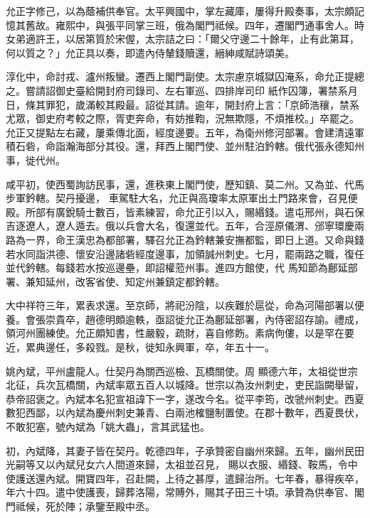 \begin{pinyinscope}
 允正字修己，以為蔭補供奉官。太平興國中，掌左藏庫，屢得升殿奏事，太宗頗記憶其舊故。雍熙中，與張平同掌三班，俄為閣門祗候。四年，遷閣門通事舍人。時女弟適許王，以居第質於宋偓，太宗詰之曰：「爾父守邊二十餘年，止有此第耳，何以質之？」允正具以奏，即遣內侍輦錢贖還，縉紳咸賦詩頌美。



 淳化中，命討戎、瀘州叛蠻。遷西上閣門副使。太宗慮京城獄囚淹系，命允正提總之。嘗請詔御史臺給開封府司錄司、左右軍巡、四排岸司印
 紙作囚簿，署禁系月日，條其罪犯，歲滿較其殿最。詔從其請。逾年，開封府上言：「京師浩穰，禁系尤眾，御史府考較之際，胥吏奔命，有妨推鞫，況無欺隱，不煩推校。」卒罷之。允正又提點左右藏，屢乘傳北面，經度邊要。五年，為衛州修河部署。會建清遠軍積石砦，命詣瀚海部分其役。還，拜西上閣門使、並州駐泊鈐轄。俄代張永德知州事，徙代州。



 咸平初，使西蜀詢訪民事，還，進秩東上閣門使，歷知鎮、莫二州。又為並、代馬步軍鈐轄。契丹擾邊，
 車駕駐大名，允正與高瓊率太原軍出土門路來會，召見便殿。所部有廣銳騎士數百，皆素練習，命允正引以入，賜緡錢。遣屯邢州，與石保吉逐遼人，遼人遁去。俄以兵會大名，復還並代。五年，合涇原儀渭、邠寧環慶兩路為一界，命王漢忠為都部署，驛召允正為鈐轄兼安撫都監，即日上道。又命與錢若水同詣洪德、懷安沿邊諸砦經度邊事，加領誠州刺史。七月，罷兩路之職，復任並代鈐轄。每錢若水按巡邊壘，即詔權蒞州事。進四方館使，代
 馬知節為鄜延部署、兼知延州，改客省使、知定州兼鎮定都鈐轄。



 大中祥符三年，累表求還。至京師，將祀汾陰，以疾難於扈從，命為河陽部署以便養。會張崇貴卒，趙德明頗逾軼，亟詔徙允正為鄜延部署，內侍密詔存諭。禮成，領河州團練使。允正頗知書，性嚴毅，疏財，喜自修飭。素病佝僂，以是罕在要近，累典邊任，多殺戮。是秋，徙知永興軍，卒，年五十一。



 姚內斌，平州盧龍人。仕契丹為關西巡檢、瓦橋關使。周
 顯德六年，太祖從世宗北征，兵次瓦橋關，內斌率眾五百人以城降。世宗以為汝州刺史，吏民詣闕舉留，恭帝詔褒之。內斌本名犯宣祖諱下一字，遂改今名。從平李筠，改虢州刺史。西夏數犯西鄙，以內斌為慶州刺史兼青、白兩池榷鹽制置使。在郡十數年，西夏畏伏，不敢犯塞，號內斌為「姚大蟲」，言其武猛也。



 初，內斌降，其妻子皆在契丹。乾德四年，子承贊密自幽州來歸。五年，幽州民田光嗣等又以內斌兒女六人間道來歸，太祖並召見，
 賜以衣服、緡錢、鞍馬，令中使護送還內斌。開寶四年，召赴闕，上待之甚厚，遣歸治所。七年春，暴得疾卒，年六十四。遣中使護喪，歸葬洛陽，常賻外，賜其子田三十頃。承贊為供奉官、閣門祗候，死於陣；承鑒至殿中丞。




\end{pinyinscope}
